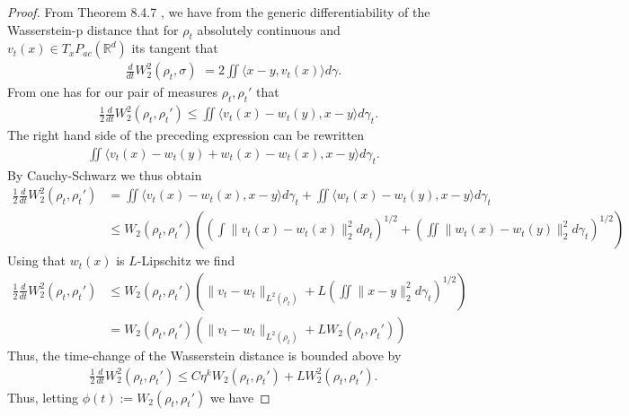 \documentclass[reqno,11pt,letterpaper]{amsart}
\theoremstyle{plain}
\theoremstyle{definition}
\theoremstyle{remark}
\begin{document}
\begin{proof}
From Theorem 8.4.7 \cite{AGS2008}, we have from the generic differentiability of the Wasserstein-p distance that for $\rho_{t}$ absolutely continuous and $v_{t}(x) \in T_{x}{P}_{ac}(\mathbb{R}^{d})$ its tangent that
\begin{align*}
    \frac{d}{dt} W_{2}^{2} (\rho_{t}, \sigma ) \,\,  = 2 \iint \langle x - y, v_{t}(x) \rangle d\gamma.
\end{align*}
From \cite{AGS2008} one has for our pair of measures $\rho_{t}, \rho_{t}'$ that
\begin{align*}
    &\frac{1}{2}\frac{d}{dt} W_{2}^{2} (\rho_{t}, \rho_{t}') \leq \iint \langle v_{t}(x) - w_{t}(y)
    , x - y \rangle   d\gamma_{t}.
\end{align*}
The right hand side of the preceding expression can be rewritten 
\begin{align*}
    \iint \langle v_{t}(x) - w_{t}(y) + w_{t}(x) - w_{t}(x)
    , x - y \rangle   d\gamma_{t}.
\end{align*}
By Cauchy-Schwarz we thus obtain 
\begin{align*}
   \frac{1}{2}\frac{d}{dt} W_{2}^{2} (\rho_{t}, \rho_{t}') &=
    \iint \langle v_{t}(x) - w_{t}(x), x - y \rangle   d\gamma_{t}   + \iint \langle w_{t}(x) - w_{t}(y) , x - y \rangle   d\gamma_{t} \\
    &\leq
    W_{2} (\rho_{t}, \rho_{t}' ) \left( \left( \int \lVert v_{t}(x) - w_{t}(x) \rVert_{2}^{2} d\rho_{t}  \right)^{1/2}
     + \left( \iint \lVert w_{t}(x) - w_{t}(y) \rVert_{2}^{2} d\gamma_{t}  \right)^{1/2} \right) 
\end{align*}
Using that $w_{t}(x)$ is $L$-Lipschitz we find
\begin{align*}
   \frac{1}{2}\frac{d}{dt} W_{2}^{2} (\rho_{t}, \rho_{t}') &\leq   W_{2} (\rho_{t}, \rho_{t}' )\left(
    \lVert v_{t} - w_{t} \rVert_{L^{2}(\rho_{t})} + L \left( \iint \lVert x - y \rVert_{2}^{2} d\gamma_{t}  \right)^{1/2} \right) \\
    &= W_{2} (\rho_{t}, \rho_{t}' )\left(
    \lVert v_{t} - w_{t} \rVert_{L^{2}(\rho_{t})} + L W_{2} (\rho_{t}, \rho_{t}' ) \right)
\end{align*}
Thus, the time-change of the Wasserstein distance is bounded above by
\begin{align*}
    \frac{1}{2}\frac{d}{dt} W_{2}^{2} (\rho_{t}, \rho_{t}') \leq 
    C \eta^{k}  W_{2} (\rho_{t}, \rho_{t}' ) + L W_{2}^{2} (\rho_{t}, \rho_{t}' ). 
\end{align*}
Thus, letting $\phi(t):=W_{2}(\rho_{t}, \rho_{t}') $ we have

\end{proof}
\end{document}

